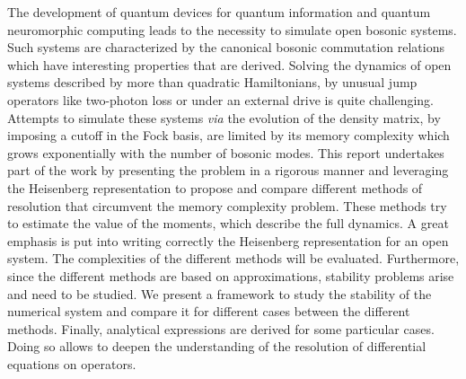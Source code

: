 The development of quantum devices for quantum information and quantum neuromorphic computing leads to the necessity to simulate open bosonic systems. Such systems are characterized by the canonical bosonic commutation relations which have interesting properties that are derived. Solving the dynamics of open systems described by more than quadratic Hamiltonians, by unusual jump operators like two-photon loss or under an external drive is quite challenging. Attempts to simulate these systems \textit{via} the evolution of the density matrix, by imposing a cutoff in the Fock basis, are limited by its memory complexity which grows exponentially with the number of bosonic modes. This report undertakes part of the work by presenting the problem in a rigorous manner and leveraging the Heisenberg representation to propose and compare different methods of resolution that circumvent the memory complexity problem. These methods try to estimate the value of the moments, which describe the full dynamics. A great emphasis is put into writing correctly the Heisenberg representation for an open system. The complexities of the different methods will be evaluated. Furthermore, since the different methods are based on approximations, stability problems arise and need to be studied. We present a framework to study the stability of the numerical system and compare it for different cases between the different methods. Finally, analytical expressions are derived for some particular cases. Doing so allows to deepen the understanding of the resolution of differential equations on operators.
